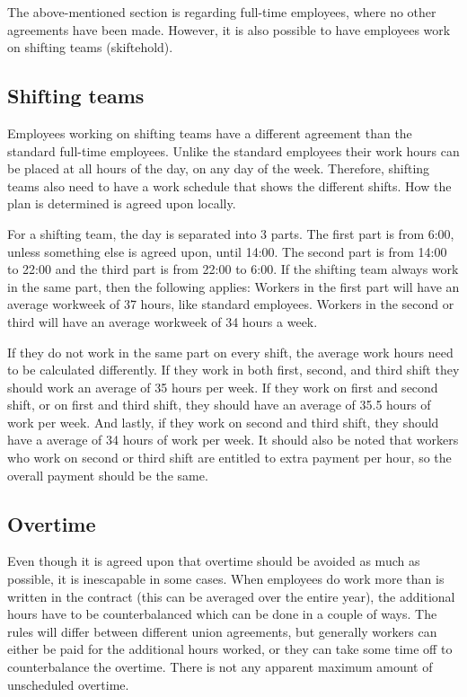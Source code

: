 The above-mentioned section is regarding full-time employees, where no other agreements have been made. However, it is also possible to have employees work on shifting teams (skiftehold). \parencite{industriens_overenskomst}

\subsection{Shifting teams}
Employees working on shifting teams have a different agreement than the standard full-time employees. Unlike the standard employees their work hours can be placed at all hours of the day, on any day of the week. Therefore, shifting teams also need to have a work schedule that shows the different shifts. How the plan is determined is agreed upon locally.

For a shifting team, the day is separated into 3 parts. The first part is from 6:00, unless something else is agreed upon, until 14:00. The second part is from 14:00 to 22:00 and the third part is from 22:00 to 6:00. If the shifting team always work in the same part, then the following applies:
Workers in the first part will have an average workweek of 37 hours, like standard employees.
Workers in the second or third will have an average workweek of 34 hours a week.

If they do not work in the same part on every shift, the average work hours need to be calculated differently. If they work in both first, second, and third shift they should work an average of 35 hours per week. If they work on first and second shift, or on first and third shift, they should have an average of 35.5 hours of work per week. And lastly, if they work on second and third shift, they should have a average of 34 hours of work per week.
It should also be noted that workers who work on second or third shift are entitled to extra payment per hour, so the overall payment should be the same.

\subsection{Overtime}
Even though it is agreed upon that overtime should be avoided as much as possible, it is inescapable in some cases. When employees do work more than is written in the contract (this can be averaged over the entire year), the additional hours have to be counterbalanced which can be done in a couple of ways. The rules will differ between different union agreements, but generally workers can either be paid for the additional hours worked, or they can take some time off to counterbalance the overtime. There is not any apparent maximum amount of unscheduled overtime.

